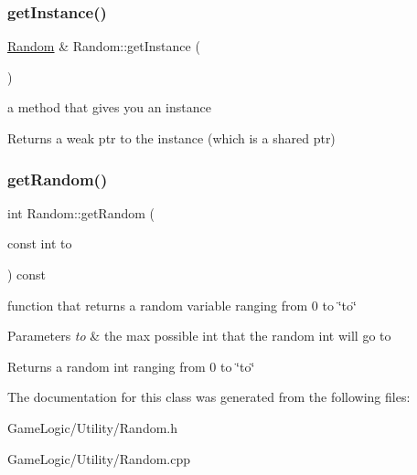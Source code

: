 \subsubsection{\texorpdfstring{get\+Instance()}{getInstance()}}
{\footnotesize\ttfamily \hyperlink{classRandom}{Random} \& Random\+::get\+Instance (\begin{DoxyParamCaption}{ }\end{DoxyParamCaption})\hspace{0.3cm}{\ttfamily [static]}}

a method that gives you an instance \begin{DoxyReturn}{Returns}
a weak ptr to the instance (which is a shared ptr) 
\end{DoxyReturn}
\mbox{\label{classRandom_a8d04412a06213d3c3b279bbd54e2981e}} 
\subsubsection{\texorpdfstring{get\+Random()}{getRandom()}}
{\footnotesize\ttfamily int Random\+::get\+Random (\begin{DoxyParamCaption}\item[{const int}]{to }\end{DoxyParamCaption}) const}

function that returns a random variable ranging from 0 to \char`\"{}to\char`\"{} 
\begin{DoxyParams}{Parameters}
{\em to} & the max possible int that the random int will go to \\
\hline
\end{DoxyParams}
\begin{DoxyReturn}{Returns}
a random int ranging from 0 to \char`\"{}to\char`\"{} 
\end{DoxyReturn}


The documentation for this class was generated from the following files\+:\begin{DoxyCompactItemize}
\item 
Game\+Logic/\+Utility/Random.\+h\item 
Game\+Logic/\+Utility/Random.\+cpp\end{DoxyCompactItemize}
